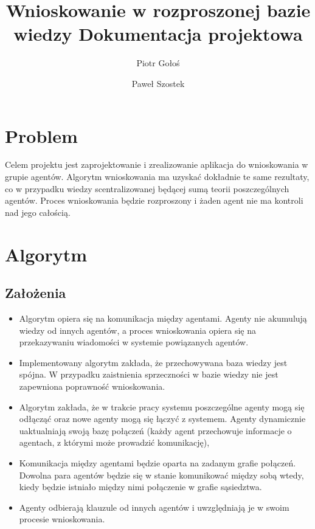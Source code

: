 \documentclass[a4paper,12pt]{mwart}
\title{Wnioskowanie w rozproszonej bazie wiedzy Dokumentacja projektowa}
\author{Piotr Gołoś \and Paweł Szostek}
\begin{document}
\maketitle
\section{Problem}
Celem projektu jest zaprojektowanie i zrealizowanie aplikacja do wnioskowania w grupie agentów. Algorytm wnioskowania ma uzyskać dokładnie te same rezultaty, co w przypadku wiedzy scentralizowanej będącej sumą teorii poszczególnych agentów. Proces wnioskowania będzie rozproszony i żaden agent nie ma kontroli nad jego całością. 

\section{Algorytm}
\subsection{Założenia}
\begin{itemize}
\item Algorytm opiera się na komunikacja między agentami. Agenty nie akumulują wiedzy od innych agentów, a proces wnioskowania opiera się na przekazywaniu wiadomości w systemie powiązanych agentów.
\item Implementowany algorytm zakłada, że przechowywana baza wiedzy jest spójna. W przypadku zaistnienia sprzeczności w bazie wiedzy nie jest zapewniona poprawność wnioskowania.
\item Algorytm zakłada, że w trakcie pracy systemu poszczególne agenty mogą się odłącząć oraz nowe agenty mogą się łączyć z systemem. Agenty dynamicznie uaktualniają swoją bazę połączeń (każdy agent przechowuje informacje o agentach, z którymi może prowadzić komunikację),
\item Komunikacja między agentami będzie oparta na zadanym grafie połączeń. Dowolna para agentów będzie się w stanie komunikować między sobą wtedy, kiedy będzie istniało między nimi połączenie w grafie sąsiedztwa.
\item Agenty odbierają klauzule od innych agentów i uwzględniają je w swoim procesie wnioskowania.
\end{itemize}
\end{document}
